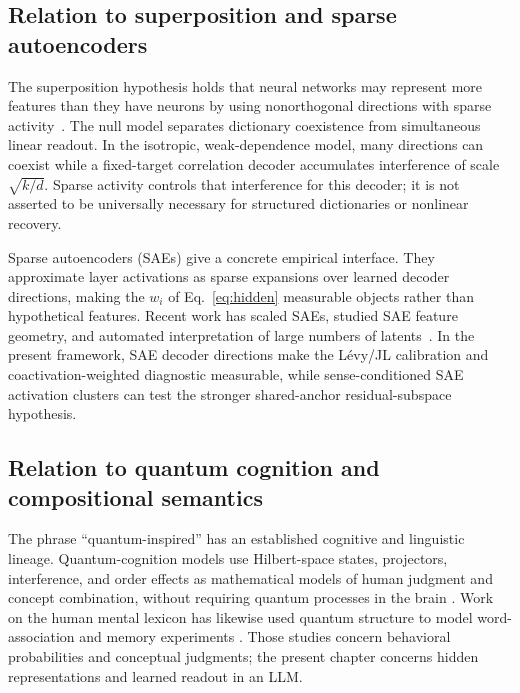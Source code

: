 \documentclass[
  aps,
  reprint,
  superscriptaddress,
  floatfix,
  nofootinbib,
  longbibliography
]{revtex4-2}
\begin{document}
\subsection{Relation to superposition and sparse autoencoders}
\label{sec:superposition}

The superposition hypothesis holds that neural networks may represent more
features than they have neurons by using nonorthogonal directions with sparse
activity~\cite{elhage2022superposition,bricken2023monosemanticity}.  The null
model separates dictionary coexistence from simultaneous linear readout.  In
the isotropic, weak-dependence model, many directions can coexist while a
fixed-target correlation decoder accumulates interference of scale
$\sqrt{k/d}$.  Sparse activity controls that interference for this decoder;
it is not asserted to be universally necessary for structured dictionaries or
nonlinear recovery.

Sparse autoencoders (SAEs) give a concrete empirical interface. They
approximate layer activations as sparse expansions over learned decoder
directions, making the $w_i$ of Eq.~\eqref{eq:hidden} measurable
objects rather than hypothetical features. Recent work has scaled SAEs,
studied SAE feature geometry, and automated interpretation of large
numbers of latents~\cite{gao2025scaling,li2025geometry,paulo2025automatically,shu2025survey}. In the
present framework, SAE decoder directions make the L\'evy/JL calibration and
coactivation-weighted diagnostic measurable, while sense-conditioned SAE
activation clusters can test the stronger shared-anchor residual-subspace hypothesis.

\subsection{Relation to quantum cognition and compositional semantics}
\label{sec:related-quantum}

The phrase ``quantum-inspired'' has an established cognitive and linguistic
lineage.  Quantum-cognition models use Hilbert-space states, projectors,
interference, and order effects as mathematical models of human judgment and
concept combination, without requiring quantum processes in the brain
\cite{Busemeyer2012,aerts2005b}.  Work on the human mental lexicon has likewise
used quantum structure to model word-association and memory experiments
\cite{bruza2009lexicon}.  Those studies concern behavioral probabilities and
conceptual judgments; the present chapter concerns hidden representations and
learned readout in an LLM.
\end{document}
